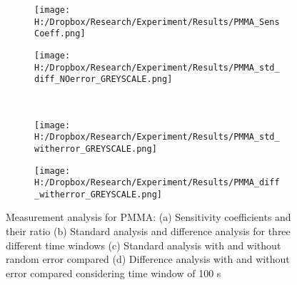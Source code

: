 \documentclass[12pt]{article}
\begin{document}
\begin{comment}

\begin{table}


\begin{tabular}{|l|c|c|c|}

\hline
& PMMA & XPS & Straw  \tabularnewline

\hline

\(\approx t_0\) {[}\(s\){]} & \(100\) & \(50\) & \(80\)\tabularnewline

\hline

\(\approx t_{max}\){[}\(s\){]} & \(390\) & \(395\) &
\(335\)\tabularnewline

\hline

\end{tabular}
\caption[Table caption text]{Time window chosen for parameter estimation for the three different samples} 

\end{table}
\end{comment}


\begin{figure}
\begin{subfigure}{.5\textwidth}
\centering
\texttt{[image: H:/Dropbox/Research/Experiment/Results/PMMA\_SensCoeff.png]}
\caption{}
\end{subfigure}\hfill
\begin{subfigure}{.5\textwidth}
\centering
\texttt{[image: H:/Dropbox/Research/Experiment/Results/PMMA\_std\_diff\_NOerror\_GREYSCALE.png]}
\caption{}
\end{subfigure}\\
\begin{subfigure}{.5\textwidth}
\centering
\texttt{[image: H:/Dropbox/Research/Experiment/Results/PMMA\_std\_witherror\_GREYSCALE.png]}
\caption{}
\end{subfigure}\hfill
\begin{subfigure}{.5\textwidth}
\centering
\texttt{[image: H:/Dropbox/Research/Experiment/Results/PMMA\_diff\_witherror\_GREYSCALE.png]}
\caption{}
\end{subfigure}
\caption{Measurement analysis for PMMA: (a) Sensitivity coefficients and their ratio (b) Standard analysis and difference analysis for three different time windows (c) Standard analysis with and without random error compared (d) Difference analysis with and without error compared considering time window of 100 s}

\end{figure}
\end{document}
